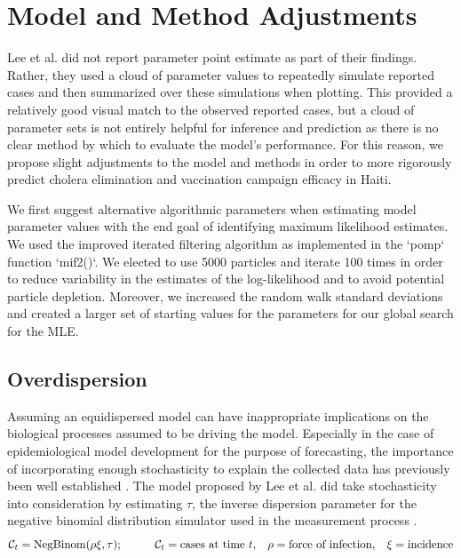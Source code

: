 \documentclass[12pt]{article}
\begin{document}
\section{Model and Method Adjustments}

  Lee et al. did not report parameter point estimate as part of their findings. Rather, they used a cloud of parameter values to repeatedly simulate reported cases and then summarized over these simulations when plotting. This provided a relatively good visual match to the observed reported cases, but a cloud of parameter sets is not entirely helpful for inference and prediction as there is no clear method by which to evaluate the model's performance. For this reason, we propose slight adjustments to the model and methods in order to more rigorously predict cholera elimination and vaccination campaign efficacy in Haiti.
  
  We first suggest alternative algorithmic parameters when estimating model parameter values with the end goal of identifying maximum likelihood estimates. We used the improved iterated filtering algorithm as implemented in the `pomp` function `mif2()`. We elected to use 5000 particles and iterate 100 times in order to reduce variability in the estimates of the log-likelihood and to avoid potential particle depletion. Moreover, we increased the random walk standard deviations and created a larger set of starting values for the parameters for our global search for the MLE.

\subsection{Overdispersion}

  Assuming an equidispersed model can have inappropriate implications on the biological processes assumed to be driving the model. Especially in the case of epidemiological model development for the purpose of forecasting, the importance of incorporating enough stochasticity to explain the collected data has previously been well established \cite{Breto_timeseriesmech, King_av}. The model proposed by Lee et al. did take stochasticity into consideration by estimating $\tau$, the inverse dispersion parameter for the negative binomial distribution simulator used in the measurement process \cite{King_statinfpomp, Lee_supp}.
        \begin{equation}
        \mathcal{C}_t = \textrm{NegBinom}(\rho \xi, \tau); \hspace{10mm} \mathcal{C}_t = \textrm{cases at time } t, \hspace{3mm} \rho = \textrm{force of infection}, \hspace{3mm} \xi = \textrm{incidence}
        \end{equation}
        
\end{document}

